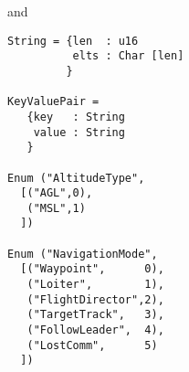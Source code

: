 \documentclass[svgnames]{llncs}
\begin{document}
\begin{enumerate}
\noindent and
\begin{verbatim}
String = {len  : u16
          elts : Char [len]
         }

KeyValuePair =
   {key   : String
    value : String
   }

Enum ("AltitudeType",
  [("AGL",0),
   ("MSL",1)
  ])

Enum ("NavigationMode",
  [("Waypoint",      0),
   ("Loiter",        1),
   ("FlightDirector",2),
   ("TargetTrack",   3),
   ("FollowLeader",  4),
   ("LostComm",      5)
  ])
\end{verbatim}

\end{enumerate}





\end{document}
